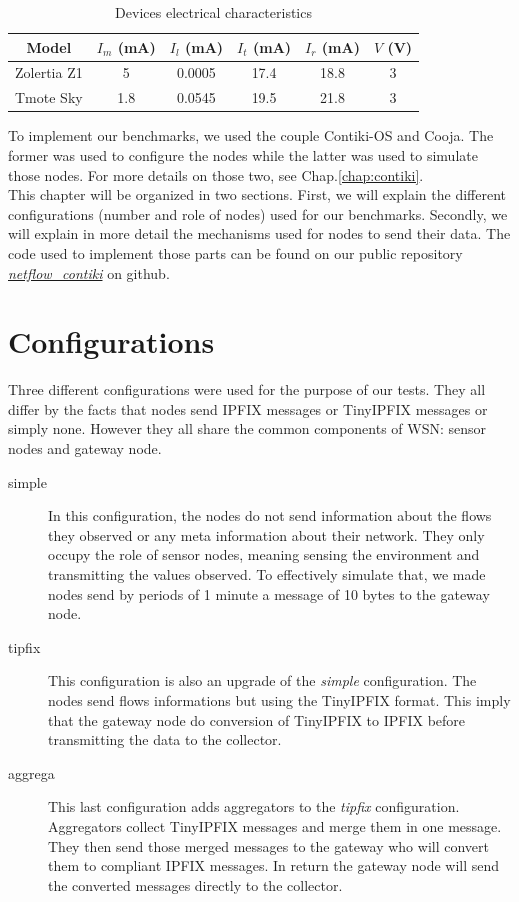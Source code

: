 \begin{table}
  \centering

  \begin{tabular}{|c|c|c|c|c|c|}
    \hline
    Model & $I_m$ (mA) & $I_l$ (mA) & $I_t$ (mA) & $I_r$ (mA) & $V$ (V)\\
    \hline
    Zolertia Z1 & 5 & 0.0005 & 17.4 & 18.8 & 3 \\
    \hline
    Tmote Sky & 1.8 & 0.0545 & 19.5 & 21.8 & 3 \\
    \hline
  \end{tabular}
  \caption{Devices electrical characteristics}
  \label{table:device_consumption}
\end{table}

To implement our benchmarks, we used the couple Contiki-OS and Cooja. The former was used to configure the nodes while the latter was used to simulate those nodes. For more details on those two, see Chap.\ref{chap:contiki}.\\

This chapter will be organized in two sections. First, we will explain the different configurations (number and role of nodes) used for our benchmarks. Secondly, we will explain in more detail the mechanisms used for nodes to send their data. The code used to implement those parts can be found on our public repository \textit{\href{https://github.com/edd19/netflow_contiki}{netflow\_contiki}} on github.

\section{Configurations}
Three different configurations were used for the purpose of our tests. They all differ by the facts that nodes send IPFIX messages or TinyIPFIX messages  or simply none. However they all share the common components of WSN: sensor nodes and gateway node.

\begin{description}
  \item[simple] In this configuration, the nodes do not send information about the flows they observed or any meta information about their network. They only occupy the role of sensor nodes, meaning sensing the environment and transmitting the values observed. To effectively simulate that, we made nodes send by periods of 1 minute a message of 10 bytes to the gateway node.
  \item[tipfix] This configuration is also an upgrade of the \textit{simple} configuration. The nodes send flows informations but using the TinyIPFIX format. This imply that the gateway node do conversion of TinyIPFIX to IPFIX before transmitting the data to the collector.
  \item[aggrega] This last configuration adds aggregators to the \textit{tipfix} configuration. Aggregators collect TinyIPFIX messages and merge them in one message. They then send those merged messages to the gateway who will convert them to compliant IPFIX messages. In return the gateway node will send the converted messages directly to the collector. \\
\end{description}

